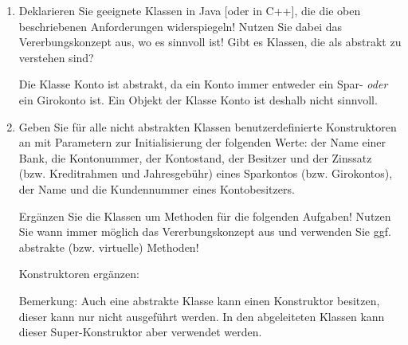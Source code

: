 \documentclass{lehramt-informatik-aufgabe}
\begin{document}
\begin{enumerate}


\item Deklarieren Sie geeignete Klassen in Java [oder in C++], die die oben beschriebenen Anforderungen
widerspiegeln! Nutzen Sie dabei das Vererbungskonzept aus, wo es
sinnvoll ist! Gibt es Klassen, die als abstrakt zu verstehen sind?


\begin{liAntwort}
Die Klasse Konto ist abstrakt, da ein Konto immer entweder ein Spar-
\emph{oder} ein Girokonto
ist. Ein Objekt der Klasse Konto ist deshalb nicht sinnvoll.
\end{liAntwort}


\item Geben Sie für alle nicht abstrakten Klassen benutzerdefinierte
Konstruktoren an mit Parametern zur Initialisierung der folgenden Werte:
der Name einer Bank, die Kontonummer, der Kontostand, der Besitzer und
der Zinssatz (bzw. Kreditrahmen und Jahresgebühr) eines Sparkontos (bzw.
Girokontos), der Name und die Kundennummer eines Kontobesitzers.

Ergänzen Sie die Klassen um Methoden für die folgenden Aufgaben! Nutzen
Sie wann immer möglich das Vererbungskonzept aus und verwenden Sie ggf.
abstrakte (bzw. virtuelle) Methoden!


\begin{liAntwort}
Konstruktoren ergänzen:

Bemerkung: Auch eine abstrakte Klasse kann einen Konstruktor besitzen,
dieser kann nur nicht ausgeführt werden. In den abgeleiteten Klassen
kann dieser Super-Konstruktor aber verwendet werden.
\end{liAntwort}



\end{enumerate}
\end{document}

